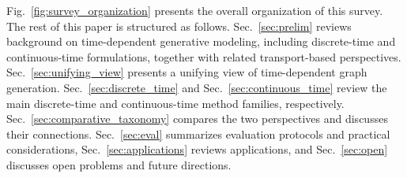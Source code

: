 \documentclass{article}
\begin{document}
Fig.~\ref{fig:survey_organization} presents the overall organization of this survey. The rest of this paper is structured as follows. Sec.~\ref{sec:prelim} reviews background on time-dependent generative modeling, including discrete-time and continuous-time formulations, together with related transport-based perspectives. Sec.~\ref{sec:unifying_view} presents a unifying view of time-dependent graph generation. Sec.~\ref{sec:discrete_time} and Sec.~\ref{sec:continuous_time} review the main discrete-time and continuous-time method families, respectively. Sec.~\ref{sec:comparative_taxonomy} compares the two perspectives and discusses their connections. Sec.~\ref{sec:eval} summarizes evaluation protocols and practical considerations, Sec.~\ref{sec:applications} reviews applications, and Sec.~\ref{sec:open} discusses open problems and future directions.
\end{document}
